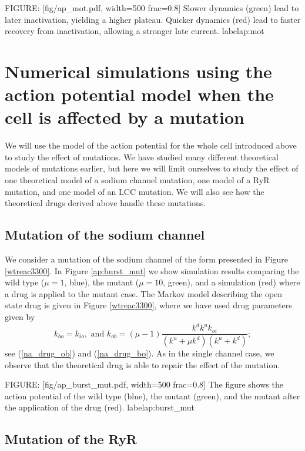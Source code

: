 FIGURE: [fig/ap_mot.pdf, width=500 frac=0.8] Slower dynamics (green) lead to later inactivation, yielding a higher plateau. Quicker dynamics (red) lead to faster recovery from inactivation, allowing a stronger late current.  label{ap:mot}


\section[Numerical action potential; mutations]{Numerical simulations using the action potential model when the cell is affected by a mutation}

We will use the model of the action potential for the whole cell introduced above to study the effect of mutations. We have studied many different theoretical models of mutations earlier, but here we will limit ourselves to study the effect of one theoretical model of a sodium channel mutation, one model of a RyR mutation, and one model of an LCC mutation. We will also see how the theoretical drugs derived above handle these mutations.




\subsection{Mutation of the sodium channel}

We consider a mutation of the sodium channel of the form presented in Figure \ref{wtreac3300}.
In Figure \ref{ap:burst_mut} we show simulation results comparing the wild type ($\mu=1$, blue),
the mutant ($\mu=10$, green), and a simulation (red) where  a drug is applied to the mutant case.
The Markov model describing the open state drug is given
in Figure \ref{wtreac3300}, where we have used drug parameters given by
\[
k_{bo} = k_{io}, \mbox{\ and \ }
k_{ob}=\left(  \mu-1\right)  \frac{k^{d}k^{u}k_{oi}}{\left(  k^{u}+\mu
k^{d}\right)  \left(  k^{u}+k^{d}\right)  };
\]
see (\ref{na_drug_ob}) and (\ref{na_drug_bo}).
As in the single channel case, we observe that the theoretical drug is able to repair the effect of the mutation.


FIGURE: [fig/ap_burst_mut.pdf, width=500 frac=0.8] The figure shows the action potential of the wild type (blue), the mutant (green), and the
mutant after the application of the drug (red). label{ap:burst_mut}

\subsection{Mutation of the RyR}

